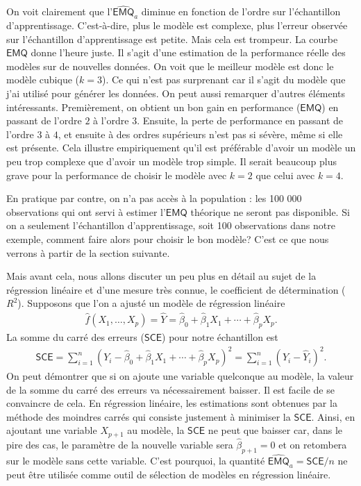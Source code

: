 \documentclass[
  11pt,
  letterpaper,
]{book}
\theoremstyle{definition}
\theoremstyle{definition}
\theoremstyle{definition}
\theoremstyle{remark}
\begin{document}
On voit clairement que l'\(\widehat{\mathsf{EMQ}}_a\) diminue en fonction de l'ordre sur l'échantillon d'apprentissage. C'est-à-dire, plus le modèle est complexe, plus l'erreur observée sur l'échantillon d'apprentissage est petite. Mais cela est trompeur. La courbe \(\mathsf{EMQ}\) donne l'heure juste. Il s'agit d'une estimation de la performance réelle des modèles sur de nouvelles données. On voit que le meilleur modèle est donc le modèle cubique (\(k=3\)). Ce qui n'est pas surprenant car il s'agit du modèle que j'ai utilisé pour générer les données. On peut aussi remarquer d'autres éléments intéressants. Premièrement, on obtient un bon gain en performance (\(\mathsf{EMQ}\)) en passant de l'ordre \(2\) à l'ordre \(3\). Ensuite, la perte de performance en passant de l'ordre \(3\) à \(4\), et ensuite à des ordres supérieurs n'est pas si sévère, même si elle est présente. Cela illustre empiriquement qu'il est préférable d'avoir un modèle un peu trop complexe que d'avoir un modèle trop simple. Il serait beaucoup plus grave pour la performance de choisir le modèle avec \(k=2\) que celui avec \(k=4\).

En pratique par contre, on n'a pas accès à la population : les 100 000 observations qui ont servi à estimer l'\(\mathsf{EMQ}\) théorique ne seront pas disponible. Si on a seulement l'échantillon d'apprentissage, soit 100 observations dans notre exemple, comment faire alors pour choisir le bon modèle? C'est ce que nous verrons à partir de la section suivante.

Mais avant cela, nous allons discuter un peu plus en détail au sujet de la régression linéaire et d'une mesure très connue, le coefficient de détermination (\(R^2\)). Supposons que l'on a ajusté un modèle de régression linéaire
\begin{align*}
\widehat{f}(X_1, \ldots, X_p) = \widehat{Y}=\widehat{\beta}_0 + \widehat{\beta}_1X_1+ \cdots + \widehat{\beta}_p X_p.
\end{align*}
La somme du carré des erreurs (\(\mathsf{SCE}\)) pour notre échantillon est
\begin{align*}
\mathsf{SCE}=\sum_{i=1}^n (Y_i - \widehat{\beta}_0 + \widehat{\beta}_1X_1+ \cdots + \widehat{\beta}_p X_p)^2 = \sum_{i=1}^n (Y_i-\widehat{Y}_i)^2.
 \end{align*}
On peut démontrer que si on ajoute une variable quelconque au modèle, la valeur de la somme du carré des erreurs va nécessairement baisser. Il est facile de se convaincre de cela. En régression linéaire, les estimations sont obtenues par la méthode des moindres carrés qui consiste justement à minimiser la \(\mathsf{SCE}\). Ainsi, en ajoutant une variable \(X_{p+1}\) au modèle, la \(\mathsf{SCE}\) ne peut que baisser car, dans le pire des cas, le paramètre de la nouvelle variable sera \(\widehat{\beta}_{p+1}=0\) et on retombera sur le modèle sans cette variable. C'est pourquoi, la quantité \(\widehat{\mathsf{EMQ}}_a=\mathsf{SCE}/n\) ne peut être utilisée comme outil de sélection de modèles en régression linéaire.
\end{document}
